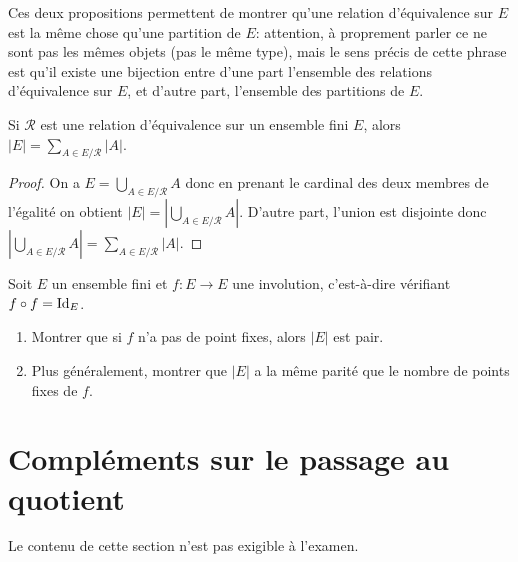 Ces deux propositions permettent de montrer qu'\og une relation d'équivalence sur $E$ est la même chose qu'une partition de $E$\fg : attention, à proprement parler ce ne sont pas les mêmes objets (pas le même type), mais le sens précis de cette phrase est qu'il existe une bijection entre d'une part l'ensemble des relations d'équivalence sur $E$, et d'autre part, l'ensemble des partitions de $E$.

\begin{corollaire}
Si $\mathcal R$ est une relation d'équivalence sur un ensemble fini $E$, alors $|E| = \sum_{A\in E/\mathcal R} |A|$.
\end{corollaire}
\begin{proof}
On a  $E= \bigcup_{A\in E/\mathcal R} A$ donc en prenant le cardinal des deux membres de l'égalité on obtient $|E| = \left| \bigcup_{A\in E/\mathcal R} A \right|$. D'autre part, l'union est disjointe donc $\left| \bigcup_{A\in E/\mathcal R} A \right| = \sum_{A\in E/\mathcal R} |A|$.
\end{proof}

\begin{exercice}
Soit $E$ un ensemble fini et $f : E\to E$ une involution, c'est-à-dire vérifiant $f\circ f = \operatorname{Id}_E$.
\begin{enumerate}
\item Montrer que si $f$ n'a pas de point fixes, alors $|E|$ est pair.
\item Plus généralement, montrer que $|E|$ a la même parité que le nombre de points fixes de $f$.
\end{enumerate}
\end{exercice}

























\section{Compléments sur le passage au quotient}

Le contenu de cette section n'est pas exigible à l'examen.

